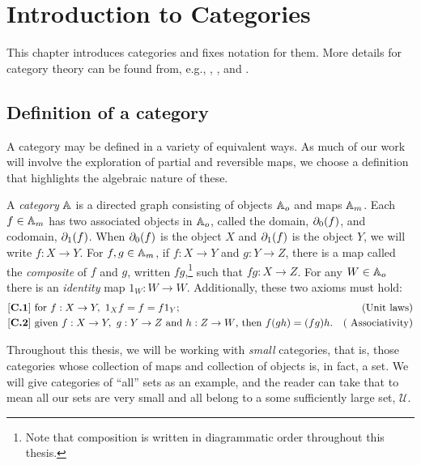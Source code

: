 
\chapter{Introduction to Categories}\label{chap:introduction_to_categories}

This chapter introduces categories and fixes notation for them. More
details for category theory can be found from, e.g., \cite{barr:ctcs}, \cite{cockett2009:ctcs},
\cite{maclan97:categorieswrkmath} and \cite{various:nlab}.

\section{Definition of a category}
\label{sec:definition_of_a_category}


A category may be defined in a variety of equivalent ways. As much of our work will involve the
exploration of partial and reversible maps, we choose a definition that highlights the algebraic
nature of these.

\begin{definition}\label{def:category}
  A \emph{category} $\mathbb{A}$ is a directed graph consisting of objects $\mathbb{A}_o$ and maps $\mathbb{A}_m$. Each $f\in
  \mathbb{A}_m$ has two associated objects in $\mathbb{A}_o$, called the domain, $\partial_0({f})$, and codomain,
  $\partial_1({f})$. When $\partial_0({f})$ is the object $X$  and $\partial_1({f})$ is the object $Y$, we
  will write $f:X \to Y$. For $f, g \in \mathbb{A}_m$, if $f:X\to Y$ and $g:Y \to Z$, there is a map called
  the \emph{composite} of $f$ and $g$, written $f g$,\footnote{Note that composition is written in
    diagrammatic order throughout this thesis.} such that $f g:X \to Z$. For any $W \in \mathbb{A}_o$ there is
  an \emph{identity} map $1_W:W \to W$. Additionally, these two axioms must hold:
  \begin{align*}
    \catone &\text{ for }f:X \to Y,\ 1_X f = f = f 1_Y;&\text{(Unit laws)}\\
    \cattwo &\text{ given }f:X \to Y,\ g:Y \to Z\text{ and }h: Z\to W\text{, then }f (g h) = (f g) h.&\text{( Associativity)}
  \end{align*}
\end{definition}

Throughout   this thesis, we will be working with \emph{small} categories, that is, those categories
whose collection of maps and collection of objects is, in fact, a set. We will give categories of
``all'' sets as an example, and the reader can take that to mean all our sets are very small and all
belong to a some sufficiently large set, $\mathcal{U}$.

